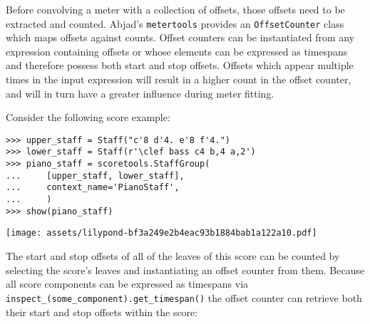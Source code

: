 Before convolving a meter with a collection of offsets, those offsets need to
be extracted and counted. Abjad's \texttt{metertools} provides an
\texttt{OffsetCounter} class which maps offsets against counts. Offset counters
can be instantiated from any expression containing offsets or whose elements
can be expressed as timespans and therefore possess both start and stop
offsets. Offsets which appear multiple times in the input expression will
result in a higher count in the offset counter, and will in turn have a greater
influence during meter fitting.

Consider the following score example:

\begin{comment}
<abjad>
upper_staff = Staff("c'8 d'4. e'8 f'4.")
lower_staff = Staff(r'\clef bass c4 b,4 a,2')
piano_staff = scoretools.StaffGroup(
    [upper_staff, lower_staff],
    context_name='PianoStaff',
    )
show(piano_staff)
</abjad>
\end{comment}

\begin{singlespacing}
\vspace{-0.5\baselineskip}
\begin{lstlisting}
>>> upper_staff = Staff("c'8 d'4. e'8 f'4.")
>>> lower_staff = Staff(r'\clef bass c4 b,4 a,2')
>>> piano_staff = scoretools.StaffGroup(
...     [upper_staff, lower_staff],
...     context_name='PianoStaff',
...     )
>>> show(piano_staff)
\end{lstlisting}
\noindent\texttt{[image: assets/lilypond-bf3a249e2b4eac93b1884bab1a122a10.pdf]}
\end{singlespacing}

\noindent The start and stop offsets of all of the leaves of this score can be
counted by selecting the score's leaves and instantiating an offset counter
from them. Because all score components can be expressed as timespans via
\texttt{inspect\_(some\_component).get\_timespan()} the offset counter can
retrieve both their start and stop offsets within the score:

\begin{comment}
<abjad>
leaves = piano_staff.select_leaves(allow_discontiguous_leaves=True)
piano_staff_counter = metertools.OffsetCounter(leaves)
print(format(piano_staff_counter))
show(piano_staff_counter)
</abjad>
\end{comment}

